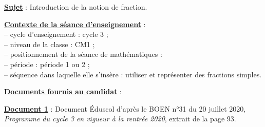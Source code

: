 {\bf\uline{Sujet}} : Introduction de la notion de fraction. \medskip

{\bf\uline{Contexte de la séance d'enseignement}} : \\
   \hspace*{5mm} -- cycle d'enseignement : cycle 3 ; \\
   \hspace*{5mm} -- niveau de la classe : CM1 ; \\
   \hspace*{5mm} -- positionnement de la séance de mathématiques : \\
      \hspace*{10mm} -- période : période 1 ou 2 ; \\
      \hspace*{10mm} -- séquence dans laquelle elle s'insère : utiliser et représenter des fractions simples. \bigskip

{\bf\uline{Documents fournis au candidat}} : \medskip

{\bf\uline{Document 1}} : Document Éduscol d'après le BOEN n°31 du 20 juillet 2020, {\it Programme du cycle 3 en vigueur à la rentrée 2020}, extrait de la page 93.

